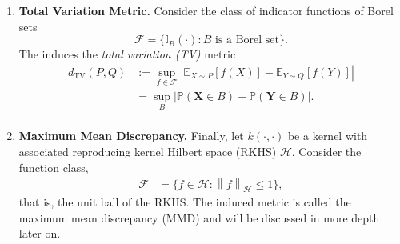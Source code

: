 \documentclass[12pt]{article}
\newcommand*{\abs}[1]{\left\lvert#1\right\rvert}
\newcommand{\indicatorSub}[1]{\mathbb{I}_{#1}} %
\newcommand*{\norm}[1]{\left\lVert#1\right\rVert}
\newcommand{\bX}{\mathbf{X}}
\newcommand{\bY}{\mathbf{Y}}
\newcommand{\E}{\mathbb{E}}
\newcommand{\Prob}{\mathbb{P}}
\newcommand{\Ker}{k}
\newcommand{\IPMClass}{\mathcal{F}} %
\newcommand{\RKHS}{\mathcal{H}}
\newcommand{\fIPM}{f} %
\newcommand{\dist}{P}
\newcommand{\distApprox}{Q}
\newcommand{\metric}{d}
\begin{document}
\begin{enumerate}
\item \textbf{Total Variation Metric.} Consider the class of indicator functions of Borel sets
\[
\IPMClass = \{\indicatorSub{B}(\cdot) : B \text{ is a Borel set} \}.
\]
The induces the \textit{total variation (TV)} metric 
\begin{align*}
\metric_{\text{TV}}(\dist, \distApprox) 
&:= \sup_{\fIPM \in \IPMClass} \abs{\E_{X \sim P}\left[\fIPM(X)\right] - \E_{Y \sim Q}\left[\fIPM(Y)\right] } \\
&=  \sup_{B} \abs{\Prob(\bX \in B) - \Prob(\bY \in B) }. \\
\end{align*}

\item \textbf{Maximum Mean Discrepancy.} Finally, let $\Ker(\cdot, \cdot)$ be a kernel with associated reproducing kernel Hilbert space (RKHS) $\RKHS$. 
Consider the function class, 
\begin{align*}
\IPMClass &= \{\fIPM \in \RKHS : \norm{\fIPM}_{\RKHS} \leq 1\},
\end{align*}
that is, the unit ball of the RKHS. The induced metric is called the maximum mean discrepancy (MMD) and will be discussed in more depth later on. 


\end{enumerate}
\end{document}
